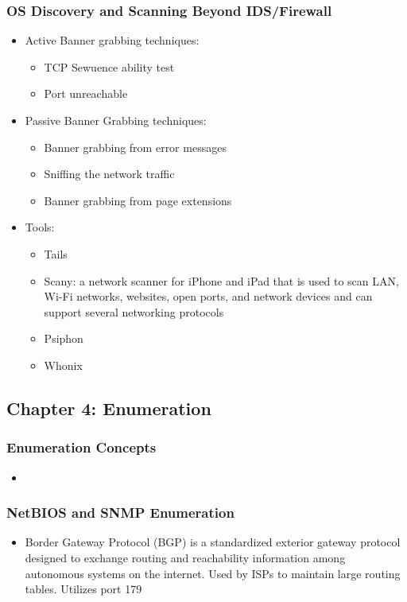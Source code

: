 \subsubsection{OS Discovery and Scanning Beyond IDS/Firewall}
\begin{itemize}
    \item Active Banner grabbing techniques:
    \begin{itemize}
        \item TCP Sewuence ability test
        \item Port unreachable 
    \end{itemize}
    \item Passive Banner Grabbing techniques:
    \begin{itemize}
        \item Banner grabbing from error messages
        \item Sniffing the network traffic
        \item Banner grabbing from page extensions
    \end{itemize}
    \item Tools:
    \begin{itemize}
        \item Tails
        \item Scany: a network scanner for iPhone and iPad that is used to scan LAN, Wi-Fi networks, websites, open ports, and network devices and can support several networking protocols
        \item Psiphon
        \item Whonix
    \end{itemize}
\end{itemize}

\subsection{Chapter 4: Enumeration}
\subsubsection{Enumeration Concepts}
\begin{itemize}
    \item 
\end{itemize}
\subsubsection{NetBIOS and SNMP Enumeration}
\begin{itemize}
    \item Border Gateway Protocol (BGP) is a standardized exterior gateway protocol designed to exchange routing and reachability information among autonomous systems on the internet. Used by ISPs to maintain large routing tables. Utilizes port 179
\end{itemize}

